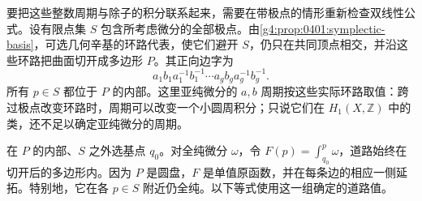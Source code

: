 要把这些整数周期与除子的积分联系起来，需要在带极点的情形重新检查双线性公式。设有限点集 \(S\) 包含所考虑微分的全部极点。由\cref{g4:prop:0401:symplectic-basis}，可选几何辛基的环路代表，使它们避开 \(S\)，仍只在共同顶点相交，并沿这些环路把曲面切开成多边形 \(P\)。其正向边字为
\[
	a_1b_1a_1^{-1}b_1^{-1}\cdots
	a_gb_ga_g^{-1}b_g^{-1}.
\]
所有 \(p\in S\) 都位于 \(P\) 的内部。这里亚纯微分的 \(a,b\) 周期按这些实际环路取值：跨过极点改变环路时，周期可以改变一个小圆周积分；只说它们在 \(H_1(X,\mathbb Z)\) 中的类，还不足以确定亚纯微分的周期。

\ProseParagraphBreak

在 \(P\) 的内部、\(S\) 之外选基点 \(q_0\)。对全纯微分 \(\omega\)，令 \(F(p)=\int_{q_0}^{p}\omega\)，道路始终在切开后的多边形内。因为 \(P\) 是圆盘，\(F\) 是单值原函数，并在每条边的相应一侧延拓。特别地，它在各 \(p\in S\) 附近仍全纯。以下等式使用这一组确定的道路值。

